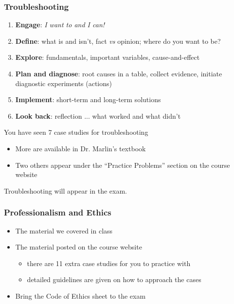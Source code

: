 \begin{frame}\frametitle{Troubleshooting}
	\begin{enumerate}
		\item	\textbf{Engage}: \emph{I want to and I can!}
		\item	\textbf{Define}: what is and isn't, fact \emph{vs} opinion; where do you want to be?
		\item	\textbf{Explore}: fundamentals, important variables, cause-and-effect
		\item	\textbf{Plan and diagnose}: root causes in a table, collect evidence, initiate diagnostic experiments (actions)
		\item	\textbf{Implement}: short-term and long-term solutions
		\item	\textbf{Look back}: reflection ... what worked and what didn't
	\end{enumerate}
	\vspace{12pt}
	You have seen 7 case studies for troubleshooting
	\begin{itemize}
		\item	More are available in Dr. Marlin's textbook
		\item	Two others appear under the ``Practice Problems'' section on the course website
	\end{itemize}
	Troubleshooting will appear in the exam.
\end{frame}

\begin{frame}\frametitle{Professionalism and Ethics}
	\begin{itemize}
		\item	The material we covered in class
		\item	The material posted on the course website
				\begin{itemize}
					\item	there are 11 extra case studies for you to practice with
					\item	detailed guidelines are given on how to approach the cases
				\end{itemize}
		\item	{\color{red} Bring the Code of Ethics sheet to the exam}
	\end{itemize}
\end{frame}


